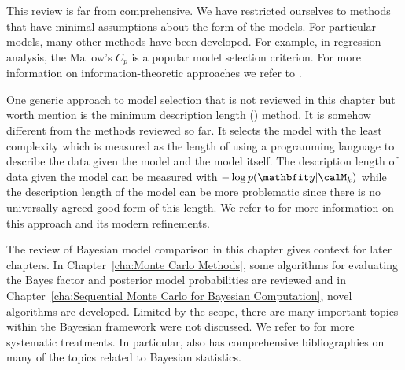 This review is far from comprehensive. We have restricted ourselves to methods that have minimal assumptions about the form of the models. For particular models, many other methods have been developed. For example, in regression analysis, the Mallow's $C_p$ is a popular model selection criterion. For more information on information-theoretic approaches we refer to \cite{Burnham:2002wc,Claeskens:2008tq}.

One generic approach to model selection that is not reviewed in this chapter but worth mention is the minimum description length (\mdl) method. It is somehow different from the methods reviewed so far. It selects the model with the least complexity which is measured as the length of using a programming language to describe the data given the model and the model itself. The description length of data given the model can be measured with $-\log p(\data|\calM_k)$ while the description length of the model can be more problematic since there is no universally agreed good form of this length. We refer to \cite{Grunwald:2005vx} for more information on this approach and its modern refinements.

The review of Bayesian model comparison in this chapter gives context for later chapters. In Chapter~\ref{cha:Monte Carlo Methods}, some algorithms for evaluating the Bayes factor and posterior model probabilities are reviewed and in Chapter~\ref{cha:Sequential Monte Carlo for Bayesian Computation}, novel algorithms are developed. Limited by the scope, there are many important topics within the Bayesian framework were not discussed. We refer to \cite{Bernardo:1994vd,Robert:2007tc} for more systematic treatments. In particular, \cite{Bernardo:1994vd} also has comprehensive bibliographies on many of the topics related to Bayesian statistics.
